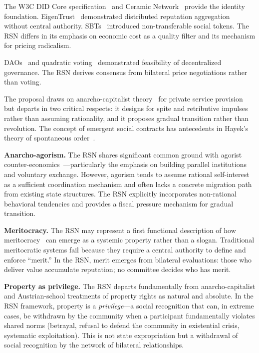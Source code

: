 \documentclass[11pt,a4paper,twocolumn]{article}
\begin{document}
The W3C DID Core specification~\cite{did2022} and Ceramic Network~\cite{ceramic2023} provide the identity foundation. EigenTrust~\cite{kamvar2003} demonstrated distributed reputation aggregation without central authority. SBTs~\cite{weyl2022} introduced non-transferable social tokens. The RSN differs in its emphasis on economic cost as a quality filter and its mechanism for pricing radicalism.

DAOs~\cite{buterin2014} and quadratic voting~\cite{buterin2019} demonstrated feasibility of decentralized governance. The RSN derives consensus from bilateral price negotiations rather than voting.

The proposal draws on anarcho-capitalist theory~\cite{rothbard1973,hoppe2001} for private service provision but departs in two critical respects: it designs for spite and retributive impulses rather than assuming rationality, and it proposes gradual transition rather than revolution. The concept of emergent social contracts has antecedents in Hayek's theory of spontaneous order~\cite{hayek1973}.

\textbf{Anarcho-agorism.} The RSN shares significant common ground with agorist counter-economics~\cite{konkin2006}---particularly the emphasis on building parallel institutions and voluntary exchange. However, agorism tends to assume rational self-interest as a sufficient coordination mechanism and often lacks a concrete migration path from existing state structures. The RSN explicitly incorporates non-rational behavioral tendencies and provides a fiscal pressure mechanism for gradual transition.

\textbf{Meritocracy.} The RSN may represent a first functional description of how meritocracy~\cite{young1958} can emerge as a systemic property rather than a slogan. Traditional meritocratic systems fail because they require a central authority to define and enforce ``merit.'' In the RSN, merit emerges from bilateral evaluations: those who deliver value accumulate reputation; no committee decides who has merit.

\textbf{Property as privilege.} The RSN departs fundamentally from anarcho-capitalist and Austrian-school treatments of property rights as natural and absolute. In the RSN framework, property is a \emph{privilege}---a social recognition that can, in extreme cases, be withdrawn by the community when a participant fundamentally violates shared norms (betrayal, refusal to defend the community in existential crisis, systematic exploitation). This is not state expropriation but a withdrawal of social recognition by the network of bilateral relationships.
\end{document}
